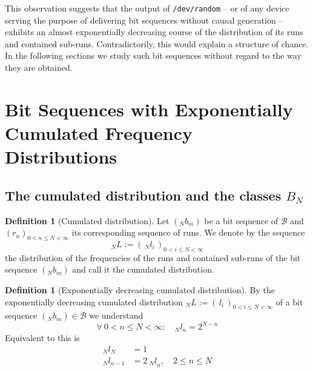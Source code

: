 \documentclass[11pt,a4paper]{scrartcl}
\theoremstyle{plain}
\theoremstyle{definition}
\newtheorem{defi}[satz]{Definition}
\theoremstyle{remark}
\begin{document}
This observation suggests that the output of \texttt{/dev/random} --
or of any device serving the purpose of delivering bit sequences
without causal generation -- exhibits an almost exponentially
decreasing course of the distribution of its runs and contained
sub-runs. Contradictorily, this would explain a structure of chance.
In the following sections we study such bit sequences without regard
to the way they are obtained.

\section{Bit Sequences with Exponentially Cumulated Frequency
Distributions}\label{sec:klassen}

\subsection{The cumulated distribution and the classes
\texorpdfstring{$B_N$}{B\_N}}

\begin{defi}[Cumulated distribution]\label{defi:kumulierteverteilung}
Let $(_Nb_m)$ be a bit sequence of $\mathcal B$ and
$(r_n)_{0<n\leq N<\infty}$ its corresponding sequence of runs. We
denote by the sequence
\begin{equation}\label{eqn:defkumuliert}
  _NL:=(\,_Nl_i\,)_{0<i\leq N<\infty}
\end{equation}
the distribution of the frequencies of the runs and contained
sub-runs of the bit sequence $(_Nb_m)$ and call it the cumulated
distribution.
\end{defi}

\begin{defi}[Exponentially decreasing cumulated
distribution]\label{defi:exponentiell}
By the exponentially decreasing cumulated distribution
$_NL:=(\,l_i\,)_{0<i\leq N<\infty}$ of a bit sequence
$(_Nb_m)\in\mathcal B$ we understand
\begin{equation}\label{eqn:exponentiellerverlauf}
  \forall\ 0<n\leq N<\infty:\quad _Nl_n=2^{N-n}
\end{equation}
Equivalent to this is
\begin{align}
  _Nl_N&=1\label{eqn:ln gleich 1}\\
  _Nl_{n-1}&=2\ {_Nl}_n,\quad 2\leq n\leq N\label{eqn:lnminus1 gleich 2 ln}
\end{align}
\end{defi}
\end{document}
